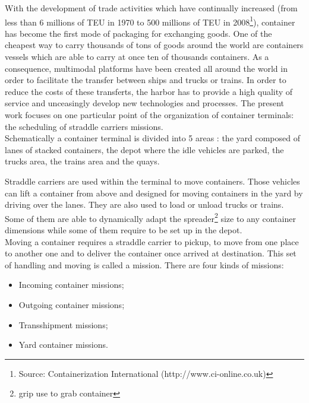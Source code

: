 \documentclass[a4paper,10pt]{article}
\begin{document}
With the development of trade activities which have continually increased (from less than 6 millions of TEU in 1970 to 500 millions of TEU in 2008\footnote{Source: Containerization International (http://www.ci-online.co.uk)}), container has become the first mode of packaging for exchanging goods. One of the cheapest way to carry thousands of tons of goods around the world are containers vessels which are able to carry at once ten of thousands containers. As a consequence, multimodal platforms have been created all around the world in order to facilitate the transfer between ships and trucks or trains. In order to reduce the costs of these transferts, the harbor has to provide a high quality of service and unceasingly develop new technologies and processes. The present work focuses on one particular point of the organization of container terminals: the scheduling of straddle carriers missions.\\

Schematically a container terminal is divided into 5 areas : the yard composed of lanes of stacked containers, the depot where the idle vehicles are parked, the trucks area, the trains area and the quays.

Straddle carriers are used within the terminal to move containers. Those vehicles can lift a container from above and designed for moving containers in the yard by driving over the lanes. They are also used to load or unload trucks or trains. Some of them are able to dynamically adapt the spreader\footnote{grip use to grab container} size to any container dimensions while some of them require to be set up in the depot.\\%


Moving a container requires a straddle carrier to pickup, to move from one place to another one and to deliver the container once arrived at destination. This set of handling and moving is called a mission. There are four kinds of missions:
\begin{itemize}
	\item Incoming container missions;
	\item Outgoing container missions;
	\item Transshipment missions;
	\item Yard container missions.
\end{itemize}
\end{document}
